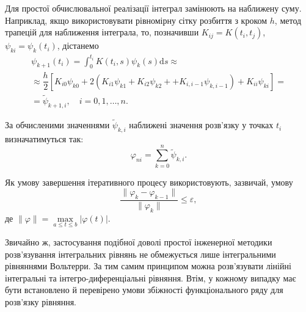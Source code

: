 \documentclass[14pt,twoside]{extreport}
\theoremstyle{mystyle}
\numberwithin{equation}{chapter}
\begin{document}
Для простої обчислювальної реалізації інтеграл замінюють на наближену суму. Наприклад, якщо використовувати рівномірну сітку розбиття з кроком $h$, метод трапецій для наближення інтеграла, то, позначивши $K_{ij} = K(t_i, t_j)$, $\psi_{ki} = \psi_k(t_i)$, дістанемо
\begin{multline}
\displaystyle\psi_{k+1}(t_{i})=\int_0^{t_i} K(t_{i},s)\psi_{k}(s)\mathrm{d}s\approx \\
\approx\dfrac{h}{2}\left[K_{i0}\psi_{k0}+2 (K_{i1}\psi_{k1}+K_{i2}\psi_{k2}+ +K_{i,i-1}\psi_{k,i-1})+K_{ii}\psi_{ki}\right]=\\
=\tilde{\psi}_{k+1,i},\quad i=0, 1, \ldots, n.
\end{multline}

За обчисленими значеннями $\tilde{\psi}_{k,i}$ наближені значення розв'язку у точках $t_i$ визначатимуться так:
\[
\varphi_{ni}=\displaystyle \sum_{k=0}^{n}\tilde{\psi}_{k,i}.
\]

Як умову завершення ітеративного процесу використовують, зазвичай, умову
\[
\dfrac{\|\varphi_{k}-\varphi_{k-1}\|}{\|\varphi_{k}\|}\leqslant\varepsilon,
\]
де $\|\varphi\| = \max\limits_{a\leqslant t\leqslant b} |\varphi(t)|$.

Звичайно ж, застосування подібної доволі простої інженерної методики розв'язування інтегральних рівнянь не обмежується лише інтегральними рівняннями Вольтерри. За тим самим принципом можна розв'язувати лінійні інтегральні та інтегро-диференціальні рівняння. Втім, у кожному випадку має бути встановлено й перевірено умови збіжності функціонального ряду для розв'язку рівняння.
\end{document}

